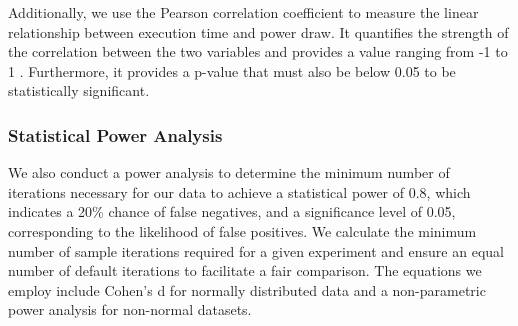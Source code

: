 \documentclass[main.tex]{subfiles}
\begin{document}
Additionally, we use the Pearson correlation coefficient to measure the linear relationship between execution time and power draw. It quantifies the strength of the correlation between the two variables and provides a value ranging from -1 to 1 \cite{sedgwick2012pearson}. Furthermore, it provides a p-value that must also be below 0.05 to be statistically significant. 

\subsubsection{Statistical Power Analysis}
We also conduct a power analysis to determine the minimum number of iterations necessary for our data to achieve a statistical power of 0.8, which indicates a 20\% chance of false negatives, and a significance level of 0.05, corresponding to the likelihood of false positives. We calculate the minimum number of sample iterations required for a given experiment and ensure an equal number of default iterations to facilitate a fair comparison. The equations we employ include Cohen's d \cite{cohen1988} for normally distributed data and a non-parametric power analysis \cite{noether1987} for non-normal datasets.
 
\end{document}
